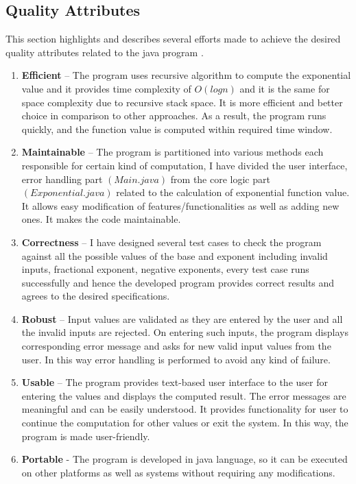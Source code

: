 \documentclass[12pt, a4paper]{article}
\begin{document}
\subsection{Quality Attributes}
This section highlights and describes several efforts made to achieve the desired quality attributes related to the java program \cite{Quality Assurance}.
\begin{enumerate}
	\item \textbf{Efficient} – The program uses recursive algorithm to compute the exponential value and it provides time complexity of $O(logn)$ and it is the same for space complexity due to recursive stack space. It is more efficient and better choice in comparison to other approaches. As a result, the program runs quickly, and the function value is computed within required time window.
	\item \textbf{Maintainable} – The program is partitioned into various methods each responsible for certain kind of computation, I have divided the user interface, error handling part $(Main.java)$ from the core logic part $(Exponential.java)$ related to the calculation of exponential function value. It allows easy modification of features/functionalities as well as adding new ones. It makes the code maintainable.
	\item \textbf{Correctness} – I have designed several test cases to check the program against all the possible values of the base and exponent including invalid inputs, fractional exponent, negative exponents, every test case runs successfully and hence the developed program provides correct results and agrees to the desired specifications.
	\item \textbf{Robust} – Input values are validated as they are entered by the user and all the invalid inputs are rejected. On entering such inputs, the program displays corresponding error message and asks for new valid input values from the user. In this way error handling is performed to avoid any kind of failure. 
	\item \textbf{Usable} – The program provides text-based user interface to the user for entering the values and displays the computed result. The error messages are meaningful and can be easily understood. It provides functionality for user to continue the computation for other values or exit the system. In this way, the program is made user-friendly.
	\item \textbf{Portable} - The program is developed in java language, so it can be executed on other platforms as well as systems without requiring any modifications. 
\end{enumerate}
\end{document}
